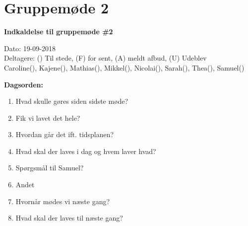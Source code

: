 \section{Gruppemøde 2}

\vspace{0.5 cm}
\textbf{Indkaldelse til gruppemøde \#2}

Dato: 19-09-2018 \\
Deltagere: () Til stede, (F) for sent, (A) meldt afbud, (U) Udeblev \\
Caroline(), Kajene(), Mathias(), Mikkel(), Nicolai(), Sarah(), Thea(), Samuel() 

\vspace{0.1 cm}
\textbf{Dagsorden:}

\begin{enumerate}
	\item Hvad skulle gøres siden sidste møde?
	\item Fik vi lavet det hele?
	\item Hvordan går det ift. tidsplanen?
	\item Hvad skal der laves i dag og hvem laver hvad?
	\item Spørgsmål til Samuel?
	\item Andet
	\item Hvornår mødes vi næste gang?
	\item Hvad skal der laves til næste gang?
\end{enumerate}

